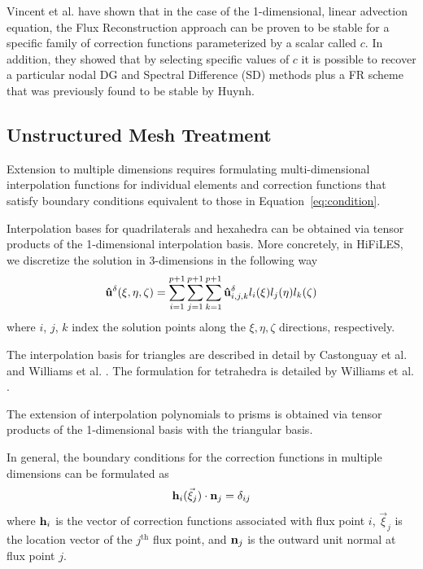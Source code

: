 Vincent et al. \cite{vincent2011new} have shown that in the case of the 1-dimensional, linear advection equation, the Flux Reconstruction approach can be proven to be stable for a specific family of correction functions parameterized by a scalar called $c$. In addition, they showed that by selecting specific values of $c$ it is possible to recover a particular nodal DG and Spectral Difference (SD) methods plus a FR scheme that was previously found to be stable by Huynh\cite{huynh2007flux}.



\subsection{Unstructured Mesh Treatment}
Extension to multiple dimensions requires formulating multi-dimensional interpolation functions for individual elements and correction functions that satisfy boundary conditions equivalent to those in Equation~\eqref{eq:condition}.

Interpolation bases for quadrilaterals and hexahedra can be obtained via tensor products of the 1-dimensional interpolation basis. More concretely, in HiFiLES, we discretize the solution in 3-dimensions in the following way
\begin{equation}
{\bf \hat{u}}^\delta(\xi,\eta,\zeta) = \sum_{i=1}^{p+1} \sum_{j=1}^{p+1} \sum_{k=1}^{p+1}
{\bf \hat{u}}^\delta_{i,j,k} l_i(\xi) l_j(\eta) l_k(\zeta)
\end{equation}
where $i$, $j$, $k$ index the solution points along the $\xi, \eta, \zeta$ directions, respectively.

The interpolation basis for triangles are described in detail by Castonguay et al. \cite{castonguay2012new} and Williams et al. \cite{williams2013tri}. The formulation for tetrahedra is detailed by Williams et al. \cite{williams2013tet}.

The extension of interpolation polynomials to prisms is obtained via tensor products of the 1-dimensional basis with the triangular basis. 

In general, the boundary conditions for the correction functions in multiple dimensions can be formulated as
\begin{equation}\label{eq:genConstraint}
{\bf h}_i( \vec{\xi}_j)\cdot {\bf n}_j = \delta_{ij}
\end{equation}
where ${\bf h}_i$ is the vector of correction functions associated with flux point $i$, $\vec{\xi}_j$ is the location vector of the $j^\text{th}$ flux point, and ${\bf n}_j$ is the outward unit normal at flux point $j$.

